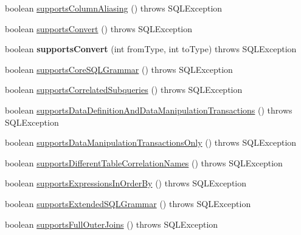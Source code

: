 \begin{DoxyCompactItemize}
boolean \mbox{\hyperlink{classcom_1_1mysql_1_1cj_1_1jdbc_1_1_database_meta_data_ac53c31cb08e612553dec9e80a8008133}{supports\+Column\+Aliasing}} ()  throws S\+Q\+L\+Exception 
\item 
boolean \mbox{\hyperlink{classcom_1_1mysql_1_1cj_1_1jdbc_1_1_database_meta_data_afabf2d6ef6b7cb8066fb868dee34deec}{supports\+Convert}} ()  throws S\+Q\+L\+Exception 
\item 
\mbox{\label{classcom_1_1mysql_1_1cj_1_1jdbc_1_1_database_meta_data_a99dceafab56ac009b79270e48c6e47ab}} 
boolean {\bfseries supports\+Convert} (int from\+Type, int to\+Type)  throws S\+Q\+L\+Exception 
\item 
boolean \mbox{\hyperlink{classcom_1_1mysql_1_1cj_1_1jdbc_1_1_database_meta_data_aaa4b1901adca2c017f21dc0943909859}{supports\+Core\+S\+Q\+L\+Grammar}} ()  throws S\+Q\+L\+Exception 
\item 
boolean \mbox{\hyperlink{classcom_1_1mysql_1_1cj_1_1jdbc_1_1_database_meta_data_aa8fae9e793548d9cac13ca227bd7e43c}{supports\+Correlated\+Subqueries}} ()  throws S\+Q\+L\+Exception 
\item 
boolean \mbox{\hyperlink{classcom_1_1mysql_1_1cj_1_1jdbc_1_1_database_meta_data_a2ade831ad8ba025596ec863ee0abe7fd}{supports\+Data\+Definition\+And\+Data\+Manipulation\+Transactions}} ()  throws S\+Q\+L\+Exception 
\item 
boolean \mbox{\hyperlink{classcom_1_1mysql_1_1cj_1_1jdbc_1_1_database_meta_data_aaba21a9c670c1397b023328c337a8d8f}{supports\+Data\+Manipulation\+Transactions\+Only}} ()  throws S\+Q\+L\+Exception 
\item 
boolean \mbox{\hyperlink{classcom_1_1mysql_1_1cj_1_1jdbc_1_1_database_meta_data_aa74636e442e66be1301fcda11e2a253f}{supports\+Different\+Table\+Correlation\+Names}} ()  throws S\+Q\+L\+Exception 
\item 
boolean \mbox{\hyperlink{classcom_1_1mysql_1_1cj_1_1jdbc_1_1_database_meta_data_a29f18a948ec16f38298bb5b999bf89c1}{supports\+Expressions\+In\+Order\+By}} ()  throws S\+Q\+L\+Exception 
\item 
boolean \mbox{\hyperlink{classcom_1_1mysql_1_1cj_1_1jdbc_1_1_database_meta_data_a6e8f775af5db51892785a928de469a58}{supports\+Extended\+S\+Q\+L\+Grammar}} ()  throws S\+Q\+L\+Exception 
\item 
boolean \mbox{\hyperlink{classcom_1_1mysql_1_1cj_1_1jdbc_1_1_database_meta_data_a50a0b715db01fb28b8de35d3a01cc5d4}{supports\+Full\+Outer\+Joins}} ()  throws S\+Q\+L\+Exception 

\end{DoxyCompactItemize}

